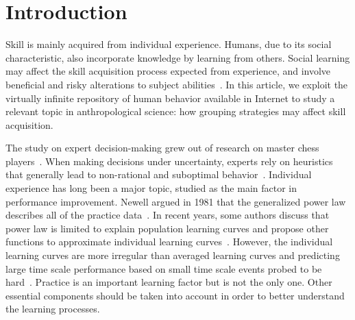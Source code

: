 \documentclass[a4paper,10pt]{book}
\theoremstyle{definition}
\begin{document}
\section{Introduction}


Skill is mainly acquired from individual experience. 
Humans, due to its social characteristic, also incorporate knowledge by learning from others.
Social learning may affect the skill acquisition process expected from experience, and involve beneficial and risky alterations to subject abilities~\cite{boyd2011-culturalNiche}.
In this article, we exploit the virtually infinite repository of human behavior available in Internet to study a relevant topic in anthropological science: how grouping strategies may affect skill acquisition.

The study on expert decision-making grew out of research on master chess players~\cite{deGroot1978-thoughtAndChoiceInChess,chase1973-perceptionInChess,simon1974-howBigIsAChunk}.
When making decisions under uncertainty, experts rely on heuristics that generally lead to non-rational and suboptimal behavior~\cite{tversky1975-judgmentUnderUncertaintyHeuristicsAndBiases,kahneman1979-decisionUnderRisk}.
Individual experience has long been a major topic, studied as the main factor in performance improvement.
Newell argued in 1981 that the generalized power law describes all of the practice data~\cite{newell1981-skillAcquisitionAndLawOfPractice}.
In recent years, some authors discuss that power law is limited to explain population learning curves and propose other functions to approximate individual learning curves~\cite{heathcote2000-powerLawRepealedExponentialLawOfPractice}.
However, the individual learning curves are more irregular than averaged learning curves and predicting large time scale performance based on small time scale events probed to be hard~\cite{howard2014-learningCurvesChessPlayersATestOfPowerLawGenerality,gaschler2014-playingOffThePredictedLearningCurve}.
Practice is an important learning factor but is not the only one.
Other essential components should be taken into account in order to better understand the learning processes.
\end{document}
